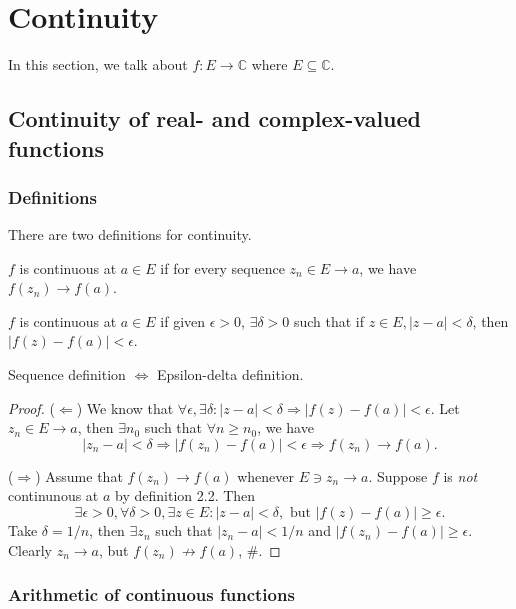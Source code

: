 \section{Continuity}
In this section, we talk about $ f:E \to \mathbb{C}  $ where $ E \subseteq \mathbb{C}  $.
\subsection{Continuity of real- and complex-valued functions}
\subsubsection*{Definitions}

There are two definitions for continuity.

\begin{definition}
    $f$ is continuous at $ a\in E $ if for every sequence $ z_n\in E\to a $, we have $ f(z_n)\to f(a) $.
\end{definition}

\begin{definition}
    $f$ is continuous at $a\in E$ if given $ \epsilon>0 $, $ \exists \delta>0 $ such that if $ z\in E, |z-a|<\delta $, then $ |f(z)-f(a)|<\epsilon $.
\end{definition}

\begin{sprop}
    Sequence definition $ \Longleftrightarrow $ Epsilon-delta definition.
\end{sprop}
\begin{proof}
    ($ \Leftarrow $) We know that $ \forall \epsilon,\exists \delta: |z-a|<\delta \Rightarrow |f(z)-f(a)|<\epsilon $. Let $ z_n\in E \to a $, then $ \exists n_0 $ such that $ \forall n\ge n_0 $, we have
    \[
        |z_n-a|<\delta \Longrightarrow |f(z_n)-f(a)|<\epsilon \Longrightarrow f(z_n) \to f(a).
    \]

    ($ \Rightarrow $) Assume that $ f(z_n)\to f(a) $ whenever $E\ni z_n\to a $. Suppose $f$ is \textit{not} continunous at $a$ by definition 2.2. Then
    \[
        \exists \epsilon>0, \forall \delta>0, \exists z\in E: |z-a|<\delta,\text{ but } |f(z)-f(a)|\ge \epsilon.
    \]
    Take $ \delta=1/n $, then $ \exists  z_n $ such that $ |z_n-a|<1/n $ and $ |f(z_n)-f(a)|\ge \epsilon $. Clearly $ z_n\to a $, but $ f(z_n)\nrightarrow f(a) $, \#.
\end{proof}

\subsubsection*{Arithmetic of continuous functions}

